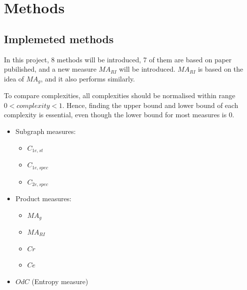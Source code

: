 \documentclass[12pt]{article}
\begin{document}
\section{Methods}
\subsection{Implemeted methods}
In this project, 8 methods will be introduced, 7 of them are based on paper pubilished\cite{KIM20082637}\cite{odc}, and a new measure $MA_{RI}$ will be introduced. $MA_{RI}$ is based on the idea of $MA_g$, and it also performs similarly.\par
To compare complexities, all complexities should be normalised within range $0<complexity<1$. Hence, finding the upper bound and lower bound of each complexity is essential, even though the lower bound for most measures is 0.
\begin{itemize}
    \item Subgraph measures:
    \begin{itemize}
        \item $C_{1e,st}$
        \item $C_{1e,spec}$
        \item $C_{2e,spec}$
    \end{itemize}
    \item Product measures:
    \begin{itemize}
        \item $MA_g$
        \item $MA_{RI}$
        \item $Cr$
        \item $Ce$
    \end{itemize}
    \item $OdC$ (Entropy measure)
\end{itemize}
\end{document}
